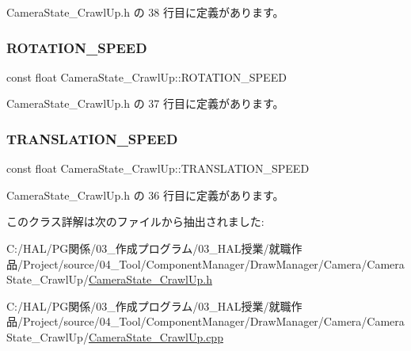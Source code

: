  Camera\+State\+\_\+\+Crawl\+Up.\+h の 38 行目に定義があります。

\mbox{\label{class_camera_state___crawl_up_af1e1ad90d163cbf9c3abfe9ee21470ed}} 
\subsubsection{\texorpdfstring{R\+O\+T\+A\+T\+I\+O\+N\+\_\+\+S\+P\+E\+ED}{ROTATION\_SPEED}}
{\footnotesize\ttfamily const float Camera\+State\+\_\+\+Crawl\+Up\+::\+R\+O\+T\+A\+T\+I\+O\+N\+\_\+\+S\+P\+E\+ED\hspace{0.3cm}{\ttfamily [private]}}



 Camera\+State\+\_\+\+Crawl\+Up.\+h の 37 行目に定義があります。

\mbox{\label{class_camera_state___crawl_up_a7db98276f51f2ff481d491a69840aee9}} 
\subsubsection{\texorpdfstring{T\+R\+A\+N\+S\+L\+A\+T\+I\+O\+N\+\_\+\+S\+P\+E\+ED}{TRANSLATION\_SPEED}}
{\footnotesize\ttfamily const float Camera\+State\+\_\+\+Crawl\+Up\+::\+T\+R\+A\+N\+S\+L\+A\+T\+I\+O\+N\+\_\+\+S\+P\+E\+ED\hspace{0.3cm}{\ttfamily [private]}}



 Camera\+State\+\_\+\+Crawl\+Up.\+h の 36 行目に定義があります。



このクラス詳解は次のファイルから抽出されました\+:\begin{DoxyCompactItemize}
\item 
C\+:/\+H\+A\+L/\+P\+G関係/03\+\_\+作成プログラム/03\+\_\+\+H\+A\+L授業/就職作品/\+Project/source/04\+\_\+\+Tool/\+Component\+Manager/\+Draw\+Manager/\+Camera/\+Camera\+State\+\_\+\+Crawl\+Up/\mbox{\hyperlink{_camera_state___crawl_up_8h}{Camera\+State\+\_\+\+Crawl\+Up.\+h}}\item 
C\+:/\+H\+A\+L/\+P\+G関係/03\+\_\+作成プログラム/03\+\_\+\+H\+A\+L授業/就職作品/\+Project/source/04\+\_\+\+Tool/\+Component\+Manager/\+Draw\+Manager/\+Camera/\+Camera\+State\+\_\+\+Crawl\+Up/\mbox{\hyperlink{_camera_state___crawl_up_8cpp}{Camera\+State\+\_\+\+Crawl\+Up.\+cpp}}\end{DoxyCompactItemize}
